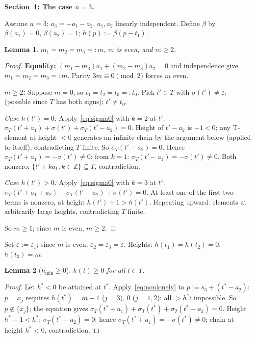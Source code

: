 \documentclass{article}
\newtheorem{lemma}{Lemma}
\begin{document}
\bigskip
\noindent\textbf{Section~1: The case $n=3$.}

Assume $n=3$; $a_3=-a_1-a_2$, $a_1,a_2$ linearly independent.
Define $\beta$ by $\beta(a_1)=0$, $\beta(a_2)=1$; $h(p):=\beta(p-t_1)$.

\begin{lemma}\label{lem:n3m}
$m_1=m_2=m_3=:m$, $m$ is even, and $m\ge 2$.
\end{lemma}
\begin{proof}
\textbf{Equality:} $(m_1-m_3)a_1+(m_2-m_3)a_2=0$ and independence give $m_1=m_2=m_3=:m$.
Parity $3m\equiv 0\pmod 2$ forces $m$ even.

\textbf{$m\ge 2$:} Suppose $m=0$, so $t_1=t_2=t_3=:t_0$.
Pick $t'\in T$ with $\sigma(t')\ne\varepsilon_1$ (possible since $T$ has both signs); $t'\ne t_0$.

\textit{Case $h(t')=0$:}
Apply~\eqref{eq:sigma0} with $k=2$ at $t'$:
$\sigma_T(t'+a_1)+\sigma(t')+\sigma_T(t'-a_2)=0$.
Height of $t'-a_2$ is $-1<0$; any T-element at height $<0$ generates an infinite chain
by the argument below (applied to itself), contradicting $T$ finite.  So $\sigma_T(t'-a_2)=0$.
Hence $\sigma_T(t'+a_1)=-\sigma(t')\ne 0$; from $k=1$: $\sigma_T(t'-a_1)=-\sigma(t')\ne 0$.
Both nonzero: $\{t'+ka_1:k\in\mathbb Z\}\subseteq T$, contradiction.

\textit{Case $h(t')>0$:}
Apply~\eqref{eq:sigma0} with $k=3$ at $t'$:
$\sigma_T(t'+a_1+a_2)+\sigma_T(t'+a_2)+\sigma(t')=0$.
At least one of the first two terms is nonzero, at height $h(t')+1>h(t')$.
Repeating upward: elements at arbitrarily large heights, contradicting $T$ finite.

So $m\ge 1$; since $m$ is even, $m\ge 2$.
\end{proof}

Set $\varepsilon:=\varepsilon_1$; since $m$ is even, $\varepsilon_2=\varepsilon_3=\varepsilon$.
Heights: $h(t_1)=h(t_2)=0$, $h(t_3)=m$.

\begin{lemma}[$h_{\min}\ge 0$]\label{lem:betamin}
$h(t)\ge 0$ for all $t\in T$.
\end{lemma}
\begin{proof}
Let $h^*<0$ be attained at $t^*$.  Apply~\eqref{eq:nonlonely} to $p:=s_3+(t^*-a_2)$:
$p=x_j$ requires $h(t^*)=m+1$ ($j=3$), $0$ ($j=1,2$): all $>h^*$: impossible.
So $p\notin\{x_j\}$; the equation gives
$\sigma_T(t^*+a_1)+\sigma_T(t^*)+\sigma_T(t^*-a_2)=0$.
Height $h^*-1<h^*$: $\sigma_T(t^*-a_2)=0$; hence $\sigma_T(t^*+a_1)=-\sigma(t^*)\ne 0$; chain at height $h^*<0$, contradiction.
\end{proof}
\end{document}
